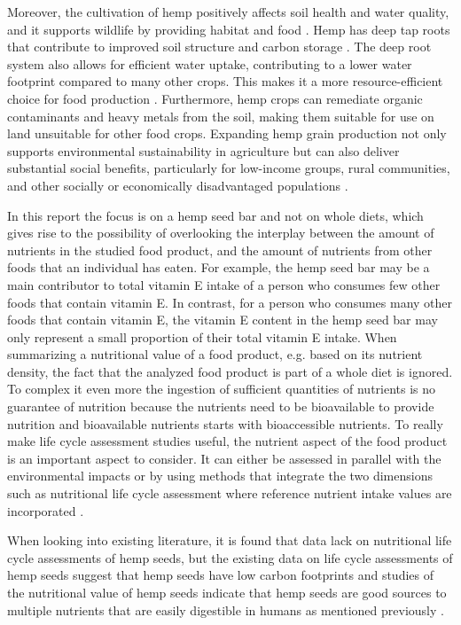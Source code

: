 \vspace{1em}
Moreover, the cultivation of hemp positively affects soil health and water quality, and it supports wildlife by providing habitat and food \cite*{HempBook}. Hemp has deep tap roots that contribute to improved soil structure and carbon storage \cite*{burton2022industrial}. The deep root system also allows for efficient water uptake, contributing to a lower water footprint compared to many other crops. This makes it a more resource-efficient choice for food production \cite*{burton2022industrial}. Furthermore, hemp crops can remediate organic contaminants and heavy metals from the soil, making them suitable for use on land unsuitable for other food crops. Expanding hemp grain production not only supports environmental sustainability in agriculture but can also deliver substantial social benefits, particularly for low-income groups, rural communities, and other socially or economically disadvantaged populations \cite*{HempBook}.

\vspace{1em}
In this report the focus is on a hemp seed bar and not on whole diets, which gives rise to the possibility of overlooking the interplay between the amount of nutrients in the studied food product, and the amount of nutrients from other foods that an individual has eaten. For example, the hemp seed bar may be a main contributor to total vitamin E intake of a person who consumes few other foods that contain vitamin E. In contrast, for a person who consumes many other foods that contain vitamin E, the vitamin E content in the hemp seed bar may only represent a small proportion of their total vitamin E intake. When summarizing a nutritional value of a food product, e.g. based on its nutrient density, the fact that the analyzed food product is part of a whole diet is ignored. To complex it even more the ingestion of sufficient quantities of nutrients is no guarantee of nutrition because the nutrients need to be bioavailable to provide nutrition and bioavailable nutrients starts with bioaccessible nutrients. To really make life cycle assessment studies useful, the nutrient aspect of the food product is an important aspect to consider. It can either be assessed in parallel with the environmental impacts or by using methods that integrate the two dimensions such as nutritional life cycle assessment where reference nutrient intake values are incorporated \cite*{McLaren2021IntegrationEnvNutritionLCA}.

\vspace{1em}
When looking into existing literature, it is found that data lack on nutritional life cycle assessments of hemp seeds, but the existing data on life cycle assessments of hemp seeds suggest that hemp seeds have low carbon footprints and studies of the nutritional value of hemp seeds indicate that hemp seeds are good sources to multiple nutrients that are easily digestible in humans as mentioned previously \cite*{TanaseApetroaei2024HempSeedsReview,Campiglia2020HempSeedProductionLCA}.

